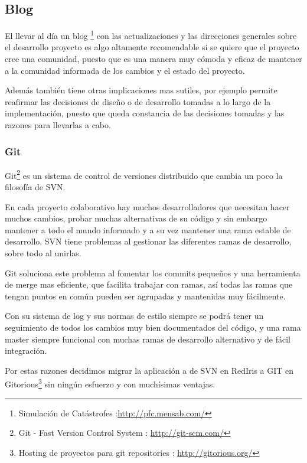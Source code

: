 \subsection*{Blog}
El llevar al día un blog \footnote{Simulación de Catástrofes
:\url{http://pfc.mensab.com/}} con las actualizaciones y las direcciones
generales sobre el desarrollo proyecto es algo altamente recomendable si se
quiere que el proyecto cree una comunidad, puesto que es una manera muy cómoda y
eficaz de mantener a la comunidad informada de los cambios y el estado del
proyecto.

Además también tiene otras implicaciones mas sutiles, por ejemplo permite
reafirmar las decisiones de diseño o de desarrollo tomadas a lo largo de la
implementación, puesto que queda constancia de las decisiones tomadas y las
razones para llevarlas a cabo.
\subsubsection*{Git}
Git\footnote{Git - Fast Version Control System : \url{http://git-scm.com/}} es
un sistema de control de versiones distribuido que cambia un poco la filosofía
de SVN.

En cada proyecto colaborativo hay muchos desarrolladores que necesitan hacer
muchos cambios, probar muchas alternativas de su código y sin embargo mantener
a todo el mundo informado y a su vez mantener una rama estable de desarrollo.
SVN tiene problemas al gestionar las diferentes ramas de desarrollo, sobre todo
al unirlas.

Git soluciona este problema al fomentar los commits pequeños y una herramienta
de merge mas eficiente, que facilita trabajar con ramas, así todas las ramas
que tengan puntos en común pueden ser agrupadas y mantenidas muy fácilmente.

Con su sistema de log y sus normas de estilo siempre se podrá tener un
seguimiento de todos los cambios muy bien documentados del código, y una rama
master siempre funcional con muchas ramas de desarrollo alternativo y de fácil
integración.

Por estas razones decidimos migrar la aplicación a de SVN en RedIris a GIT en
Gitorious\footnote{Hosting de proyectos para git repositories :
\url{http://gitorious.org/}} sin ningún esfuerzo y con muchísimas ventajas.
